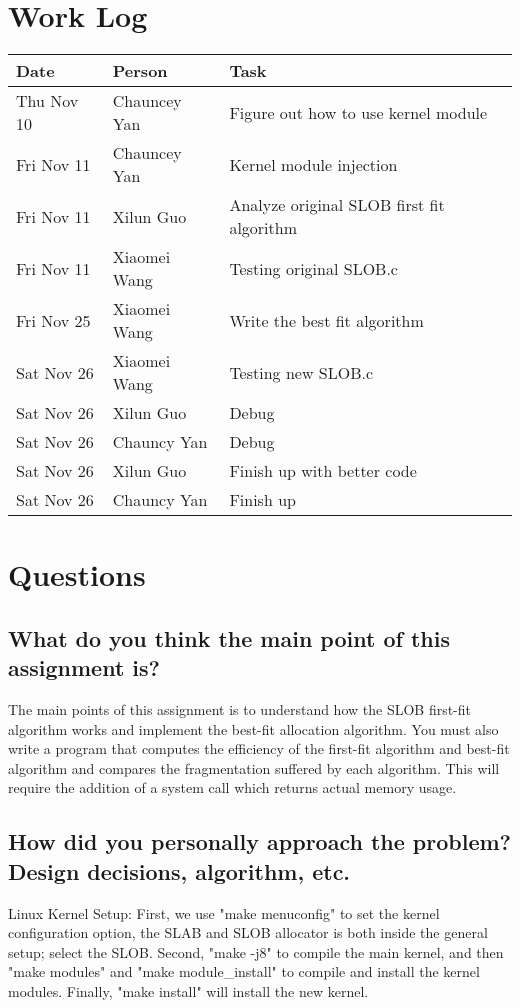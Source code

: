 \documentclass[a4paper]{article}
\begin{document}
\section{Work Log}
\begin{tabular}{ | l | l | l |}
    \hline
     Date & Person & Task \\ \hline
     Thu Nov 10 & Chauncey Yan &  Figure out how to use kernel module \\ \hline
     Fri Nov 11 & Chauncey Yan &  Kernel module injection\\ \hline
     Fri Nov 11 & Xilun Guo    &  Analyze original SLOB first fit algorithm\\ \hline
     Fri Nov 11 & Xiaomei Wang &  Testing original SLOB.c\\ \hline
     Fri Nov 25 & Xiaomei Wang &  Write the best fit algorithm\\ \hline
     Sat Nov 26 & Xiaomei Wang &  Testing new SLOB.c\\ \hline 
     Sat Nov 26 & Xilun Guo    &  Debug\\ \hline
     Sat Nov 26 & Chauncy Yan  &  Debug\\ \hline  
     Sat Nov 26 & Xilun Guo    &  Finish up with better code\\ \hline 
     Sat Nov 26 & Chauncy Yan  &  Finish up\\ \hline 
\end{tabular}

\section{Questions}
\subsection{What do you think the main point of this assignment is?}
The main points of this assignment is to understand how the SLOB first-fit algorithm works and implement the best-fit allocation algorithm. You must also write a program that computes the efficiency of the first-fit algorithm and best-fit algorithm and compares the fragmentation suffered by each algorithm. This will require the addition of a system call which returns actual memory usage.

\subsection{How did you personally approach the problem? Design decisions, algorithm, etc.}
Linux Kernel Setup: First, we use "make menuconfig" to set the kernel configuration option, the SLAB and SLOB allocator is both inside the general setup; select the SLOB. Second, "make -j8" to compile the main kernel, and then "make modules" and "make module\_install" to compile and install the kernel modules. Finally, "make install" will install the new kernel.  
\end{document}
